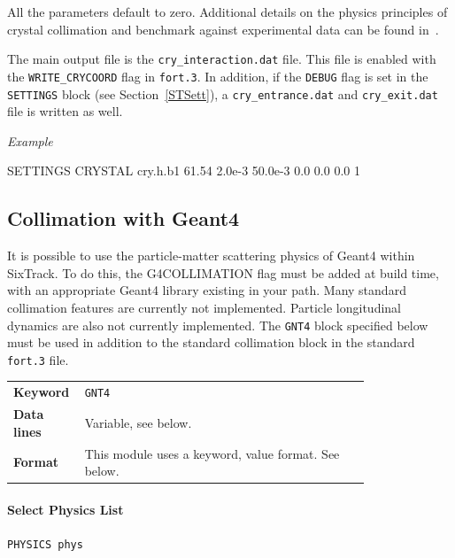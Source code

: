 \bigskip
All the parameters default to zero.
Additional details on the physics principles of crystal collimation and benchmark against experimental data can be found in~\cite{crystal:1,crystal:2,crystal:3,crystal:4,crystal:5,crystal:6}.

The main output file is the \texttt{cry\_interaction.dat} file.
This file is enabled with the \texttt{WRITE\_CRYCOORD} flag in \texttt{fort.3}.
In addition, if the \texttt{DEBUG} flag is set in the \texttt{SETTINGS} block (see Section~\ref{STSett}), a \texttt{cry\_entrance.dat} and \texttt{cry\_exit.dat} file is written as well.

\bigskip
\noindent\textit{Example}
\begin{cverbatim}
SETTINGS
CRYSTAL  cry.h.b1 61.54 2.0e-3 50.0e-3 0.0 0.0 0.0 1
\end{cverbatim}


\subsection{Collimation with Geant4}

It is possible to use the particle-matter scattering physics of Geant4 within SixTrack.
To do this, the G4COLLIMATION flag must be added at build time, with an appropriate Geant4 library existing in your path.
Many standard collimation features are currently not implemented.
Particle longitudinal dynamics are also not currently implemented.
The \texttt{GNT4} block specified below must be used in addition to the standard collimation block in the standard \texttt{fort.3} file.  

\bigskip
\begin{tabular}{@{}lp{0.8\linewidth}}
    \textbf{Keyword}    & \texttt{GNT4}\index{GNT4} \\
    \textbf{Data lines} & Variable, see below. \\
    \textbf{Format}     & This module uses a keyword, value format. See below.
\end{tabular}

\bigskip

\paragraph{Select Physics List} \texttt{PHYSICS phys}\\

